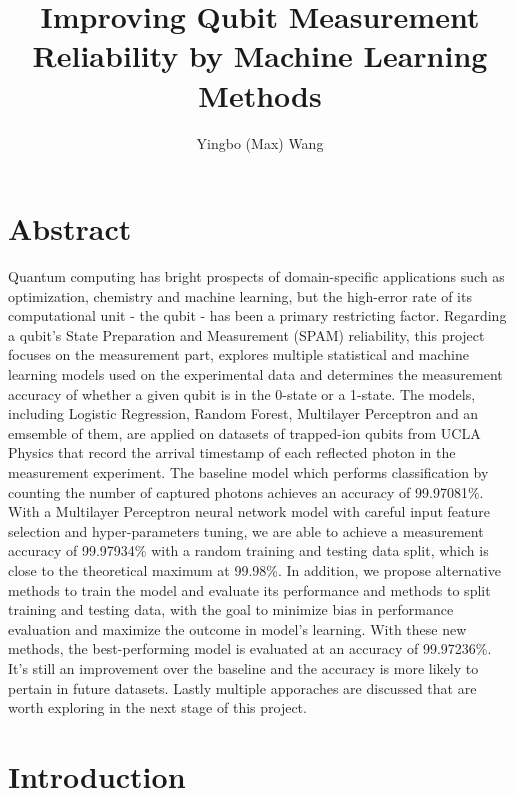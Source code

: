 \documentclass[letterpaper,twocolumn,10pt]{article}
\begin{document}
\title{Improving Qubit Measurement Reliability by Machine Learning Methods}

\author{Yingbo (Max) Wang}

\maketitle

\section{Abstract}

Quantum computing has bright prospects of domain-specific applications such as optimization, chemistry and machine learning, but the high-error rate of its computational unit - the qubit - has been a primary restricting factor. Regarding a qubit's State Preparation and Measurement (SPAM) reliability, this project focuses on the measurement part, explores multiple statistical and machine learning models used on the experimental data and determines the measurement accuracy of whether a given qubit is in the 0-state or a 1-state. The models, including Logistic Regression, Random Forest, Multilayer Perceptron and an emsemble of them, are applied on datasets of trapped-ion qubits from UCLA Physics that record the arrival timestamp of each reflected photon in the measurement experiment. The baseline model which performs classification by counting the number of captured photons achieves an accuracy of 99.97081\%. With a Multilayer Perceptron neural network model with careful input feature selection and hyper-parameters tuning, we are able to achieve a measurement accuracy of 99.97934\% with a random training and testing data split, which is close to the theoretical maximum at 99.98\%. In addition, we propose alternative methods to train the model and evaluate its performance and methods to split training and testing data, with the goal to minimize bias in performance evaluation and maximize the outcome in model's learning. With these new methods, the best-performing model is evaluated at an accuracy of 99.97236\%. It's still an improvement over the baseline and the accuracy is more likely to pertain in future datasets. Lastly multiple apporaches are discussed that are worth exploring in the next stage of this project.

\section{Introduction}
\end{document}

